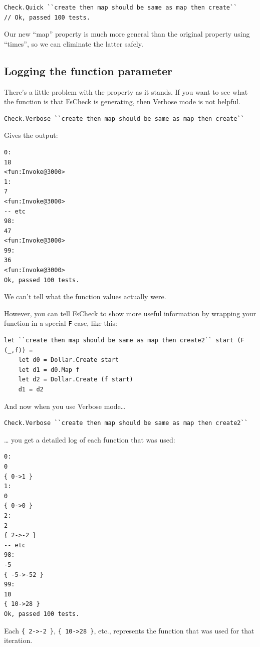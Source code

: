 \begin{verbatim}
Check.Quick ``create then map should be same as map then create`` 
// Ok, passed 100 tests.
\end{verbatim}
Our new ``map'' property is much more general than the original property
using ``times'', so we can eliminate the latter safely.

\subsection{Logging the function
parameter}
\label{logging-the-function-parameter}

There's a little problem with the property as it stands. If you want to
see what the function is that FsCheck is generating, then Verbose mode
is not helpful.

\begin{verbatim}
Check.Verbose ``create then map should be same as map then create`` 
\end{verbatim}
Gives the output:

\begin{verbatim}
0:
18
<fun:Invoke@3000>
1:
7
<fun:Invoke@3000>
-- etc
98:
47
<fun:Invoke@3000>
99:
36
<fun:Invoke@3000>
Ok, passed 100 tests.
\end{verbatim}

We can't tell what the function values actually were.

However, you can tell FsCheck to show more useful information by
wrapping your function in a special \texttt{F} case, like this:

\begin{verbatim}
let ``create then map should be same as map then create2`` start (F (_,f)) = 
	let d0 = Dollar.Create start
	let d1 = d0.Map f  
	let d2 = Dollar.Create (f start)     
	d1 = d2
\end{verbatim}
And now when you use Verbose mode\ldots{}

\begin{verbatim}
Check.Verbose ``create then map should be same as map then create2`` 
\end{verbatim}
\ldots{} you get a detailed log of each function that was used:

\begin{verbatim}
0:
0
{ 0->1 }
1:
0
{ 0->0 }
2:
2
{ 2->-2 }
-- etc
98:
-5
{ -5->-52 }
99:
10
{ 10->28 }
Ok, passed 100 tests.
\end{verbatim}

Each \texttt{\{\ 2-\textgreater{}-2\ \}},
\texttt{\{\ 10-\textgreater{}28\ \}}, etc., represents the function that
was used for that iteration.


